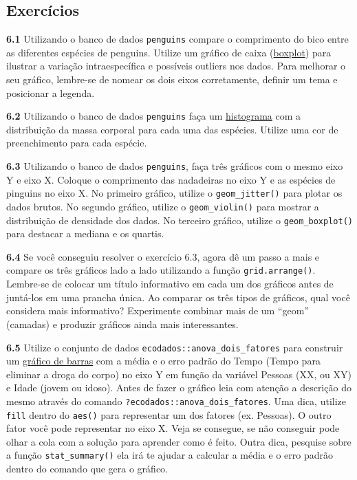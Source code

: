 \documentclass[
]{article}
\begin{document}
\hypertarget{exercuxedcios-2}{%
\subsection{Exercícios}\label{exercuxedcios-2}}

\textbf{6.1}
Utilizando o banco de dados \texttt{penguins} compare o comprimento do bico entre as diferentes espécies de penguins. Utilize um gráfico de caixa (\href{https://analises-ecologicas.netlify.app/cap6.html\#gr\%C3\%A1fico-de-caixa-boxplot}{boxplot}) para ilustrar a variação intraespecífica e possíveis outliers nos dados. Para melhorar o seu gráfico, lembre-se de nomear os dois eixos corretamente, definir um tema e posicionar a legenda.

\textbf{6.2}
Utilizando o banco de dados \texttt{penguins} faça um \href{https://analises-ecologicas.netlify.app/cap6.html\#histograma-histogram}{histograma} com a distribuição da massa corporal para cada uma das espécies. Utilize uma cor de preenchimento para cada espécie.

\textbf{6.3}
Utilizando o banco de dados \texttt{penguins}, faça três gráficos com o mesmo eixo Y e eixo X. Coloque o comprimento das nadadeiras no eixo Y e as espécies de pinguins no eixo X. No primeiro gráfico, utilize o \texttt{geom\_jitter()} para plotar os dados brutos. No segundo gráfico, utilize o \texttt{geom\_violin()} para mostrar a distribuição de densidade dos dados. No terceiro gráfico, utilize o \texttt{geom\_boxplot()} para destacar a mediana e os quartis.

\textbf{6.4}
Se você conseguiu resolver o exercício 6.3, agora dê um passo a mais e compare os três gráficos lado a lado utilizando a função \texttt{grid.arrange()}. Lembre-se de colocar um título informativo em cada um dos gráficos antes de juntá-los em uma prancha única. Ao comparar os três tipos de gráficos, qual você considera mais informativo? Experimente combinar mais de um ``geom'' (camadas) e produzir gráficos ainda mais interessantes.

\textbf{6.5}
Utilize o conjunto de dados \texttt{ecodados::anova\_dois\_fatores} para construir um \href{https://analises-ecologicas.netlify.app/cap6.html\#gr\%C3\%A1fico-de-barras-bar-plot}{gráfico de barras} com a média e o erro padrão do Tempo (Tempo para eliminar a droga do corpo) no eixo Y em função da variável Pessoas (XX, ou XY) e Idade (jovem ou idoso). Antes de fazer o gráfico leia com atenção a descrição do mesmo através do comando \texttt{?ecodados::anova\_dois\_fatores}. Uma dica, utilize \texttt{fill} dentro do \texttt{aes()} para representar um dos fatores (ex. Pessoas). O outro fator você pode representar no eixo X. Veja se consegue, se não conseguir pode olhar a cola com a solução para aprender como é feito. Outra dica, pesquise sobre a função \texttt{stat\_summary()} ela irá te ajudar a calcular a média e o erro padrão dentro do comando que gera o gráfico.
\end{document}
